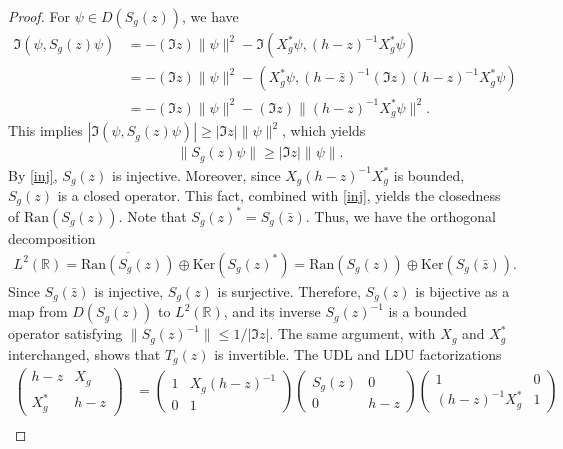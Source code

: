 \documentclass[12pt,dvipdfmx]{article}
\newcommand{\RR}{\mathbb{R}}
\newcommand{\Ran}{\mathrm{Ran}}
\newcommand{\Ker}{\mathrm{Ker}}
\begin{document}
\begin{proof}
For $\psi \in D(S_g(z))$, we have
\begin{align*}
    \Im (\psi, S_g(z)\psi) 
    &= 
    -(\Im z) \| \psi \|^2 - \Im (X_g^\ast \psi, (h - z)^{-1} X_g^\ast \psi) 
    \\
    &= 
    -(\Im z) \| \psi \|^2 - (X_g^\ast \psi, (h - \bar{z})^{-1}(\Im z)(h-z)^{-1} X_g^\ast \psi) 
    \\
    &= 
    -(\Im z) \| \psi \|^2 - (\Im z) \| (h - z)^{-1} X_g^\ast \psi \|^2.
\end{align*}
This implies $|\Im (\psi, S_g(z)\psi)| \geq |\Im z| \| \psi \|^2$, which yields
\begin{align}\label{inj}
    \| S_g(z) \psi \| \geq |\Im z| \| \psi \|.
\end{align}
By \eqref{inj}, $S_g(z)$ is injective. Moreover, since $X_g (h - z)^{-1} X_g^\ast$ is bounded, $S_g(z)$ is a closed operator. This fact, combined with \eqref{inj}, yields the closedness of $\Ran(S_g(z))$. Note that $S_g(z)^\ast = S_g(\bar{z})$. Thus, we have the orthogonal decomposition
\begin{align*}
    L^2(\RR)
    =
    \overline{\Ran(S_g(z))} \oplus \Ker(S_g(z)^\ast)
    =
    \Ran(S_g(z)) \oplus \Ker(S_g(\bar{z})).
\end{align*}
Since $S_g(\bar{z})$ is injective, $S_g(z)$ is surjective. Therefore, $S_g(z)$ is bijective as a map from $D(S_g(z))$ to $L^2(\RR)$, and its inverse $S_g(z)^{-1}$ is a bounded operator satisfying $\| S_g(z)^{-1} \| \leq 1 / |\Im z|$.
The same argument, with $X_g$ and $X_g^\ast$ interchanged, shows that $T_g(z)$ is invertible. The UDL and LDU factorizations
\begin{align*}
    \begin{pmatrix}
        h - z & X_g\\
        X_g^\ast & h - z
    \end{pmatrix}
    &=
    \begin{pmatrix}
        1 & X_g (h - z)^{-1}\\
        0 & 1
    \end{pmatrix}
    \begin{pmatrix}
        S_g(z) & 0\\
        0 & h - z
    \end{pmatrix}
    \begin{pmatrix}
        1 & 0\\
        (h - z)^{-1} X_g^\ast & 1
    \end{pmatrix}
    \\

\end{align*}
\end{proof}
\end{document}

